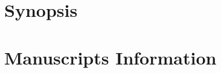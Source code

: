 \cleardoublepage %
\cleardoublepage %
\cleardoublepage %
\cleardoublepage


\cleardoublepage %






\part{Synopsis} %
\label{part:synopsis}

   
\cleardoublepage %
% 



\part{Manuscripts Information}
\label{part:manuscr-inform}

